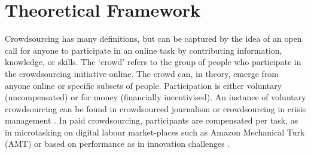 
\section{Theoretical Framework}
\label{sec:theoretical-framework}

Crowdsourcing has many definitions, but can be captured by the idea of an open call for anyone to participate in an online task \cite{brabham2013crowdsourcing, estelles2012towards,howe2008crowdsourcing} by contributing information, knowledge, or skills. The `crowd' refers to the group of people who participate in the crowdsourcing initiative online. The crowd can, in theory, emerge from anyone online or specific subsets of people. Participation is either voluntary (uncompensated) or for money (financially incentivised). An instance of voluntary crowdsourcing can be found in crowdsourced journalism \cite{aitamurto2015motivation} or crowdsourcing in crisis management \cite{schimak2015crowdsourcing}. In paid crowdsourcing, participants are compensated per task, as in microtasking on digital labour market-places such as Amazon Mechanical Turk (AMT) \cite{shank2016using} or based on performance as in innovation challenges \cite{jeppesen2010marginality}.


